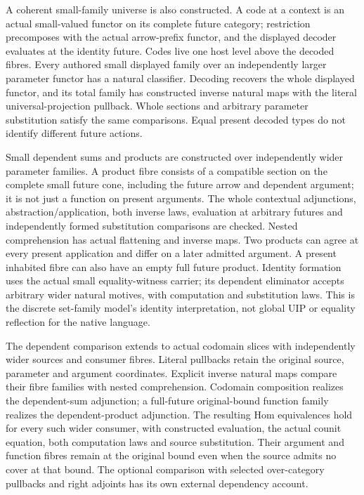 \documentclass[11pt]{article}
\theoremstyle{definition}
\theoremstyle{remark}
\begin{document}
A coherent small-family universe is also constructed.  A code at a
context is an actual small-valued functor on its complete future
category; restriction precomposes with the actual arrow-prefix functor,
and the displayed decoder evaluates at the identity future.  Codes
live one host level above the decoded fibres.  Every authored small
displayed family over an independently larger parameter functor has a
natural classifier.  Decoding recovers the whole displayed functor,
and its total family has constructed inverse natural maps with the
literal universal-projection pullback.  Whole sections and arbitrary
parameter substitution satisfy the same comparisons.  Equal present
decoded types do not identify different future actions.

Small dependent sums and products are constructed over independently
wider parameter families.  A product fibre consists of a compatible
section on the complete small future cone, including the future arrow
and dependent argument; it is not just a function on present arguments.
The whole contextual adjunctions, abstraction/application, both inverse
laws, evaluation at arbitrary futures and independently formed
substitution comparisons are checked.  Nested comprehension has actual
flattening and inverse maps.  Two products can agree at every present
application and differ on a later admitted argument.  A present inhabited
fibre can also have an empty full future product.  Identity formation
uses the actual small equality-witness carrier; its dependent eliminator
accepts arbitrary wider natural motives, with computation and substitution
laws.  This is the discrete set-family model's identity interpretation,
not global UIP or equality reflection for the native language.

The dependent comparison extends to actual codomain slices with
independently wider sources and consumer fibres. Literal pullbacks retain
the original source, parameter and argument coordinates. Explicit inverse
natural maps compare their fibre families with nested comprehension.
Codomain composition realizes the dependent-sum adjunction; a full-future
original-bound function family realizes the dependent-product adjunction.
The resulting Hom equivalences hold for every such wider consumer, with
constructed evaluation, the actual counit equation, both computation
laws and source substitution. Their argument and function fibres remain
at the original bound even when the source admits no cover at that bound.
The optional comparison with selected over-category pullbacks and right
adjoints has its own external dependency account.
\end{document}
